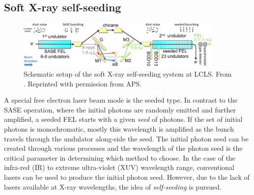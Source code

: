 \subsection{Soft X-ray self-seeding}\label{sec:sxrss}
%
\begin{figure}
	\centering
		\includegraphics[width=0.90\textwidth]{images/seeded.png}
	\caption[Schematic setup of soft X-ray self-seeding system.]{Schematic setup of the soft X-ray self-seeding system at LCLS. From \citep{Ratner-2015-PRL}. Reprinted with permission from APS.}
	\label{fig:seeded-setup}
\end{figure}
%
A special free electron laser beam mode is the seeded type. In contrast to the SASE operation, where the initial photons are randomly emitted and further amplified, a seeded FEL starts with a given \textit{seed} of photons. If the set of initial photons is monochromatic, mostly this wavelength is amplified as the bunch travels through the undulator along-side the seed. The initial photon seed can be created through various processes and the wavelength of the photon seed is the critical parameter in determining which method to choose. In the case of the infra-red (IR) to extreme ultra-violet (XUV) wavelength range, conventional lasers can be used to produce the initial photon seed. However, due to the lack of lasers available at X-ray wavelengths, the idea of \textit{self-seeding} is pursued.\\[1\baselineskip]
%
